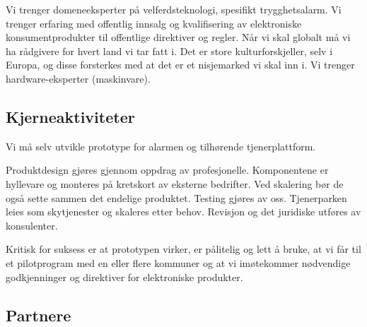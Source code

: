 Vi trenger domeneeksperter på velferdsteknologi, spesifikt trygghetsalarm. Vi
trenger erfaring med offentlig innsalg og kvalifisering av elektroniske
konsumentprodukter til offentlige direktiver og regler. Når vi skal globalt må
vi ha rådgivere for hvert land vi tar fatt i. Det er store kulturforskjeller,
selv i Europa, og disse forsterkes med at det er et nisjemarked vi skal inn i.
Vi trenger hardware-eksperter (maskinvare).




\subsection{Kjerneaktiviteter}


Vi må selv utvikle prototype for alarmen og tilhørende tjenerplattform.

Produktdesign gjøres gjennom oppdrag av profesjonelle. Komponentene er
hyllevare og monteres på kretskort av eksterne bedrifter. Ved skalering bør de
også sette sammen det endelige produktet. Testing gjøres av oss. Tjenerparken
leies som skytjenester og skaleres etter behov. Revisjon og det juridiske
utføres av konsulenter.

Kritisk for suksess er at prototypen virker, er pålitelig og lett å bruke, at vi
får til et pilotprogram med en eller flere kommuner og at vi imøtekommer
nødvendige godkjenninger og direktiver for elektroniske produkter.

\subsection{Partnere}

